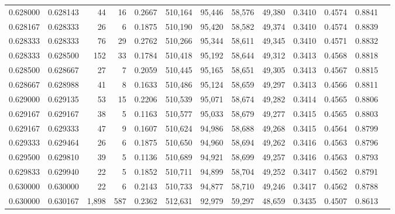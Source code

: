 \begin{tabular}{rrrrrrrrrrrrr}
0.628000 & 0.628143 &    44 &  16 &                                     0.2667 & 510,164 &  95,446 &  58,576 &  49,380 & 0.3410 & 0.4574 & 0.8841 \\
0.628167 & 0.628333 &    26 &   6 &                                     0.1875 & 510,190 &  95,420 &  58,582 &  49,374 & 0.3410 & 0.4574 & 0.8839 \\
0.628333 & 0.628333 &    76 &  29 &                                     0.2762 & 510,266 &  95,344 &  58,611 &  49,345 & 0.3410 & 0.4571 & 0.8832 \\
0.628333 & 0.628500 &   152 &  33 &                                     0.1784 & 510,418 &  95,192 &  58,644 &  49,312 & 0.3413 & 0.4568 & 0.8818 \\
0.628500 & 0.628667 &    27 &   7 &                                     0.2059 & 510,445 &  95,165 &  58,651 &  49,305 & 0.3413 & 0.4567 & 0.8815 \\
0.628667 & 0.628988 &    41 &   8 &                                     0.1633 & 510,486 &  95,124 &  58,659 &  49,297 & 0.3413 & 0.4566 & 0.8811 \\
0.629000 & 0.629135 &    53 &  15 &                                     0.2206 & 510,539 &  95,071 &  58,674 &  49,282 & 0.3414 & 0.4565 & 0.8806 \\
0.629167 & 0.629167 &    38 &   5 &                                     0.1163 & 510,577 &  95,033 &  58,679 &  49,277 & 0.3415 & 0.4565 & 0.8803 \\
0.629167 & 0.629333 &    47 &   9 &                                     0.1607 & 510,624 &  94,986 &  58,688 &  49,268 & 0.3415 & 0.4564 & 0.8799 \\
0.629333 & 0.629464 &    26 &   6 &                                     0.1875 & 510,650 &  94,960 &  58,694 &  49,262 & 0.3416 & 0.4563 & 0.8796 \\
0.629500 & 0.629810 &    39 &   5 &                                     0.1136 & 510,689 &  94,921 &  58,699 &  49,257 & 0.3416 & 0.4563 & 0.8793 \\
0.629833 & 0.629940 &    22 &   5 &                                     0.1852 & 510,711 &  94,899 &  58,704 &  49,252 & 0.3417 & 0.4562 & 0.8791 \\
0.630000 & 0.630000 &    22 &   6 &                                     0.2143 & 510,733 &  94,877 &  58,710 &  49,246 & 0.3417 & 0.4562 & 0.8788 \\
0.630000 & 0.630167 & 1,898 & 587 &                                     0.2362 & 512,631 &  92,979 &  59,297 &  48,659 & 0.3435 & 0.4507 & 0.8613 \\

\end{tabular}
